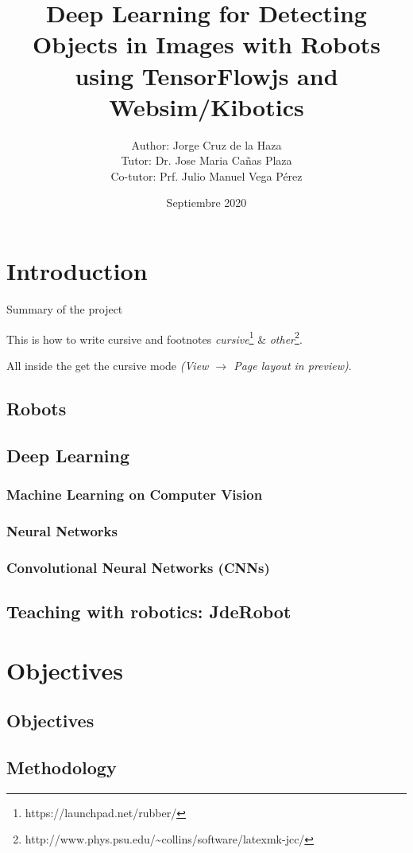 \documentclass[11pt]{article}
\title{\textbf{Deep Learning for Detecting Objects in Images with Robots using TensorFlowjs and Websim/Kibotics}}
\author{Author: Jorge Cruz de la Haza\\
		Tutor: Dr. Jose Maria Cañas Plaza\\
		Co-tutor: Prf. Julio Manuel Vega Pérez}
\date{Septiembre 2020}
\begin{document}
\maketitle
\clearpage
\tableofcontents
\clearpage

\section{Introduction}

Summary of the project

This is how to write cursive and footnotes \emph{cursive}\footnote{https://launchpad.net/rubber/} \& \emph{other}\footnote{http://www.phys.psu.edu/{\textasciitilde}collins/software/latexmk-jcc/}.

All inside the {} get the cursive mode \emph{(View $\rightarrow$ Page layout in preview)}.

\subsection{Robots}
\subsection{Deep Learning}
\subsubsection{Machine Learning on Computer Vision}
\subsubsection{Neural Networks}
\subsubsection{Convolutional Neural Networks (CNNs)}
\subsection{Teaching with robotics: JdeRobot}

\section{Objectives}
\subsection{Objectives}
\subsection{Methodology}
\end{document}
